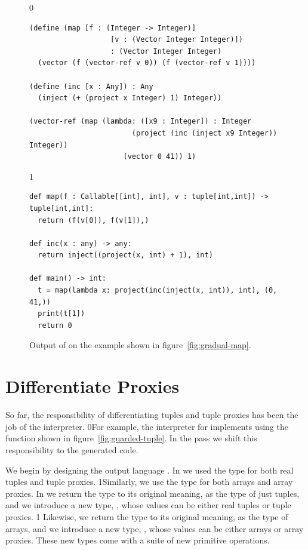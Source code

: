 \documentclass[7x10]{TimesAPriori_MIT}%
\def\racketEd{0}
\def\pythonEd{1}
\providecommand{\BookEdition}{1}
\let\edition\BookEdition
\newcommand{\racket}[1]{{\if\edition\racketEd{#1}\fi}}
\newcommand{\pythonColor}[0]{}
\newcommand{\python}[1]{{\if\edition\pythonEd\pythonColor #1\fi}}
\numberwithin{theorem}{chapter}
\numberwithin{definition}{chapter}
\numberwithin{equation}{chapter}
\begin{document}
\begin{figure}[tbp]
\begin{tcolorbox}[colback=white]  
{\if\edition\racketEd    
\begin{lstlisting}
(define (map [f : (Integer -> Integer)]
                   [v : (Vector Integer Integer)])
                   : (Vector Integer Integer)
  (vector (f (vector-ref v 0)) (f (vector-ref v 1))))

(define (inc [x : Any]) : Any
  (inject (+ (project x Integer) 1) Integer))

(vector-ref (map (lambda: ([x9 : Integer]) : Integer
                        (project (inc (inject x9 Integer)) Integer))
                      (vector 0 41)) 1)
\end{lstlisting}
\fi}
{\if\edition\pythonEd\pythonColor
\begin{lstlisting}[basicstyle=\ttfamily\footnotesize]
def map(f : Callable[[int], int], v : tuple[int,int]) -> tuple[int,int]:
  return (f(v[0]), f(v[1]),)

def inc(x : any) -> any:
  return inject((project(x, int) + 1), int)

def main() -> int:
  t = map(lambda x: project(inc(inject(x, int)), int), (0, 41,))
  print(t[1])
  return 0
\end{lstlisting}
\fi}
\end{tcolorbox}

\caption{Output of  on the example shown in
  figure~\ref{fig:gradual-map}.}
\label{fig:map-lower-cast}
\end{figure}


\section{Differentiate Proxies }
\label{sec:differentiate-proxies}

So far, the responsibility of differentiating tuples and tuple proxies
has been the job of the interpreter.
%
\racket{For example, the interpreter for \LangCast{} implements
  \code{vector-ref} using the \code{guarded-vector-ref} function shown in
  figure~\ref{fig:guarded-tuple}.}
%
In the  pass we shift this responsibility
to the generated code.

We begin by designing the output language \LangPVec{}.  In \LangGrad{}
we used the type \TUPLETYPENAME{} for both
real tuples and tuple proxies.
\python{Similarly, we use the type  for both arrays and
array proxies.}
In \LangPVec{} we return the
\TUPLETYPENAME{} type to its original
meaning, as the type of just tuples, and we introduce a new type,
\PTUPLETYNAME{}, whose values
can be either real tuples or tuple
proxies.
%
{\if\edition\pythonEd\pythonColor
Likewise, we return the
\ARRAYTYPENAME{} type to its original
meaning, as the type of arrays, and we introduce a new type,
\PARRAYTYNAME{}, whose values
can be either arrays or array proxies.
These new types come with a suite of new primitive operations.
\fi}
\end{document}
